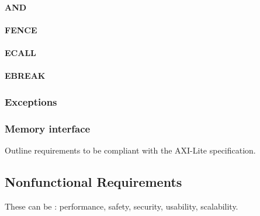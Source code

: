 \paragraph{AND}

\paragraph{FENCE}

\paragraph{ECALL}

\paragraph{EBREAK}

\subsubsection{Exceptions}



\subsubsection{Memory interface}
\label{spec-memory-interface}

\begin{content}
  Outline requirements to be compliant with the AXI-Lite specification.
\end{content}

\subsection{Nonfunctional Requirements}

\begin{content}
These can be : performance, safety, security, usability, scalability.
\end{content}

\newpage
